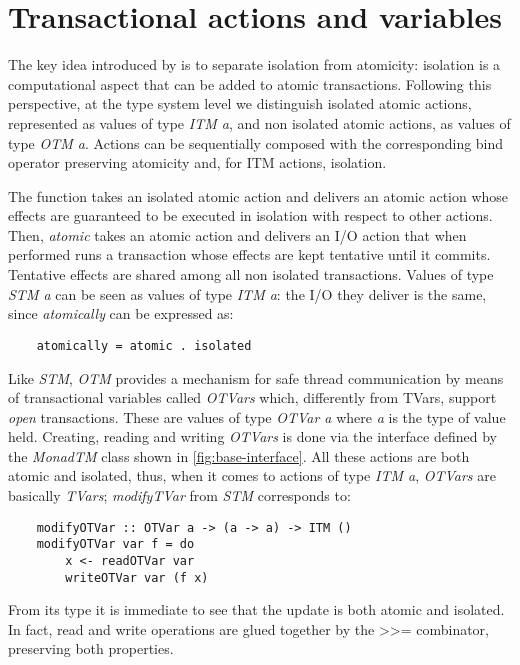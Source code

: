 \section{Transactional actions and variables}
The key idea introduced by \citet{OpenTransactionsSpec} is to separate isolation from atomicity: isolation is a computational aspect that can be added to atomic transactions.
Following this perspective, at the type system level we distinguish isolated atomic actions, represented as values of type \emph{ITM a}, and non isolated atomic actions, as values of type \emph{OTM a}. Actions can be sequentially composed with the corresponding bind operator preserving atomicity and, for ITM actions, isolation.

The function  takes an isolated atomic action and delivers an atomic action whose effects are guaranteed to be executed in isolation with respect to other actions.
Then, \emph{atomic} takes an atomic action and delivers an I/O action that when performed runs a transaction whose effects are kept tentative until it commits.
Tentative effects are shared among all non isolated transactions. Values of type \emph{STM a} can be seen as values of type \emph{ITM a}: the I/O they deliver is the same, since \emph{atomically} can be expressed as:
\begin{Verbatim}
    atomically = atomic . isolated
\end{Verbatim}

Like \emph{STM}, \emph{OTM} provides a mechanism for safe thread
communication by means of transactional variables called \emph{OTVars}
which, differently from TVars, support \emph{open} transactions.
These are values of type \emph{OTVar a} where \emph{a} is the type of value held.
Creating, reading and writing \emph{OTVars} is done via the interface defined by the \emph{MonadTM} class shown in \cref{fig:base-interface}. 
All these actions are both atomic and isolated, thus, when it comes to actions of type \emph{ITM a}, \emph{OTVars} are basically \emph{TVars};
\eg \emph{modifyTVar} from \emph{STM} corresponds to:

\begin{Verbatim}
    modifyOTVar :: OTVar a -> (a -> a) -> ITM ()
    modifyOTVar var f = do
        x <- readOTVar var
        writeOTVar var (f x) 
\end{Verbatim}
From its type it is immediate to see that the update is both atomic and isolated. In fact, read and write operations are glued together by the \textgreater \textgreater= combinator, preserving both properties.

